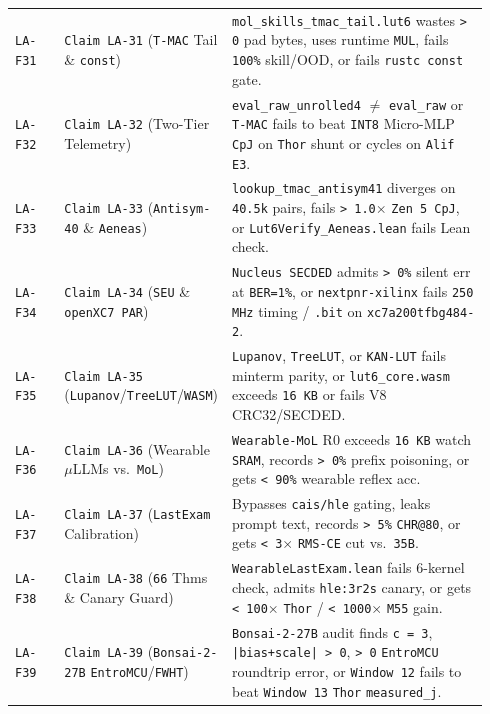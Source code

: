 \documentclass[10pt]{article}
\begin{document}
{\begin{longtable}{@{}L{0.11\linewidth}L{0.25\linewidth}L{0.58\linewidth}@{}}
\texttt{LA-F31} & \texttt{Claim LA-31} (\texttt{T-MAC} Tail \& \texttt{const}) & \texttt{mol\_skills\_tmac\_tail.lut6} wastes \texttt{> 0} pad bytes, uses runtime \texttt{MUL}, fails \texttt{100\%} skill/OOD, or fails \texttt{rustc const} gate. \\
\texttt{LA-F32} & \texttt{Claim LA-32} (Two-Tier Telemetry) & \texttt{eval\_raw\_unrolled4} $\neq$ \texttt{eval\_raw} or \texttt{T-MAC} fails to beat \texttt{INT8} Micro-MLP \texttt{CpJ} on \texttt{Thor} shunt or cycles on \texttt{Alif E3}. \\
\texttt{LA-F33} & \texttt{Claim LA-33} (\texttt{Antisym-40} \& \texttt{Aeneas}) & \texttt{lookup\_tmac\_antisym41} diverges on \texttt{40.5k} pairs, fails \texttt{> 1.0$\times$} \texttt{Zen 5 CpJ}, or \texttt{Lut6Verify\_Aeneas.lean} fails Lean check. \\
\texttt{LA-F34} & \texttt{Claim LA-34} (\texttt{SEU} \& \texttt{openXC7 PAR}) & \texttt{Nucleus SECDED} admits \texttt{> 0\%} silent err at \texttt{BER=1\%}, or \texttt{nextpnr-xilinx} fails \texttt{250 MHz} timing / \texttt{.bit} on \texttt{xc7a200tfbg484-2}. \\
\texttt{LA-F35} & \texttt{Claim LA-35} (\texttt{Lupanov}/\texttt{TreeLUT}/\texttt{WASM}) & \texttt{Lupanov}, \texttt{TreeLUT}, or \texttt{KAN-LUT} fails minterm parity, or \texttt{lut6\_core.wasm} exceeds \texttt{16 KB} or fails V8 CRC32/SECDED. \\
\texttt{LA-F36} & \texttt{Claim LA-36} (Wearable $\mu$LLMs vs.\ \texttt{MoL}) & \texttt{Wearable-MoL} R0 exceeds \texttt{16 KB} watch \texttt{SRAM}, records \texttt{> 0\%} prefix poisoning, or gets \texttt{< 90\%} wearable reflex acc. \\
\texttt{LA-F37} & \texttt{Claim LA-37} (\texttt{LastExam} Calibration) & Bypasses \texttt{cais/hle} gating, leaks prompt text, records \texttt{> 5\%} \texttt{CHR@80}, or gets \texttt{< 3$\times$} \texttt{RMS-CE} cut vs.\ \texttt{35B}. \\
\texttt{LA-F38} & \texttt{Claim LA-38} (\texttt{66} Thms \& Canary Guard) & \texttt{WearableLastExam.lean} fails 6-kernel check, admits \texttt{hle:3r2s} canary, or gets \texttt{< 100$\times$} \texttt{Thor} / \texttt{< 1000$\times$} \texttt{M55} gain. \\
\texttt{LA-F39} & \texttt{Claim LA-39} (\texttt{Bonsai-2-27B} \texttt{EntroMCU}/\texttt{FWHT}) & \texttt{Bonsai-2-27B} audit finds \texttt{c = 3}, \texttt{|bias+scale| > 0}, \texttt{> 0} \texttt{EntroMCU} roundtrip error, or \texttt{Window 12} fails to beat \texttt{Window 13} \texttt{Thor} \texttt{measured\_j}. \\

\end{longtable}}
\end{document}
